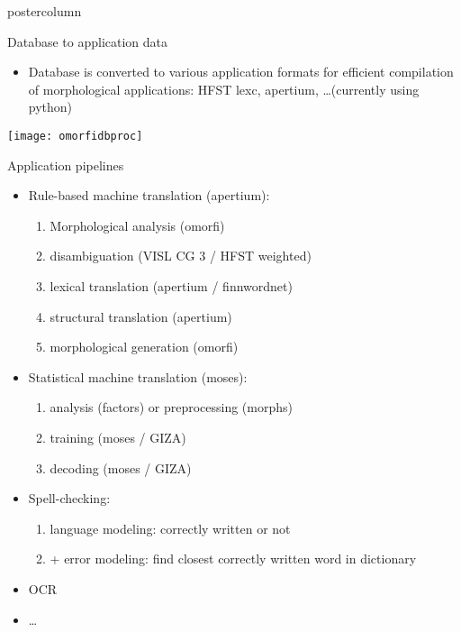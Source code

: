 \documentclass[final,hyperref={pdfpagelabels}]{beamer}
\begin{document}
\begin{frame}
\begin{columns}
\begin{column}{.49\textwidth}
\begin{beamercolorbox}[center,wd=\textwidth]{postercolumn}
\begin{minipage}[T]{.95\textwidth}
{        \begin{block}{Database to application data}
            \begin{itemize}
                \item Database is converted to various application formats for
                    efficient compilation of morphological applications:
                    HFST lexc, apertium, \ldots (currently using python)
            \end{itemize}
            \texttt{[image: omorfidbproc]}
        \end{block}

        \begin{block}{Application pipelines}
            \begin{itemize}
                \item Rule-based machine translation (apertium):
                    \begin{enumerate}
                        \item Morphological analysis (omorfi)
                        \item disambiguation (VISL CG 3 / HFST weighted)
                        \item lexical translation (apertium / finnwordnet)
                        \item structural translation (apertium)
                        \item morphological generation (omorfi)
                    \end{enumerate}
                \item Statistical machine translation (moses):
                    \begin{enumerate}
                        \item analysis (factors) or preprocessing (morphs)
                        \item training (moses / GIZA)
                        \item decoding (moses / GIZA)
                    \end{enumerate}
                \item Spell-checking:
                    \begin{enumerate}
                        \item language modeling: correctly written or not
                        \item + error modeling: find closest correctly written
                            word in dictionary
                    \end{enumerate}
                \item OCR
                \item \ldots
            \end{itemize}
        \end{block}
        
}
\end{minipage}
\end{beamercolorbox}
\end{column}
\end{columns}
\end{frame}
\end{document}
